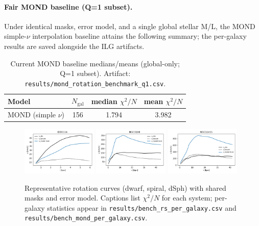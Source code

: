 \documentclass[12pt,a4paper]{article}
\begin{document}
\paragraph{Fair MOND baseline (Q=1 subset).} Under identical masks, error model, and a single global stellar M/L, the MOND simple-$\nu$ interpolation baseline attains the following summary; the per-galaxy results are saved alongside the ILG artifacts.
\begin{table}[h]
\centering
\caption{Current MOND baseline medians/means (global-only; Q=1 subset). Artifact: \texttt{results/mond\_rotation\_benchmark\_q1.csv}.}
\label{tab:mond_baseline_current}
\begin{tabular}{l c c c}
\toprule
Model & $N_\mathrm{gal}$ & median $\chi^2/N$ & mean $\chi^2/N$ \\
\midrule
MOND (simple $\nu$) & 156 & 1.794 & 3.982 \\
\bottomrule
\end{tabular}
\end{table}

\begin{figure}[h]
\centering
\includegraphics[width=0.32\textwidth]{results/examples_ddo154.png}
\includegraphics[width=0.32\textwidth]{results/examples_ngc3198.png}
\includegraphics[width=0.32\textwidth]{results/examples_fornax.png}
\caption{Representative rotation curves (dwarf, spiral, dSph) with shared masks and error model. Captions list $\chi^2/N$ for each system; per-galaxy statistics appear in \texttt{results/bench\_rs\_per\_galaxy.csv} and \texttt{results/bench\_mond\_per\_galaxy.csv}.}
\label{fig:examples}
\end{figure}
\end{document}
